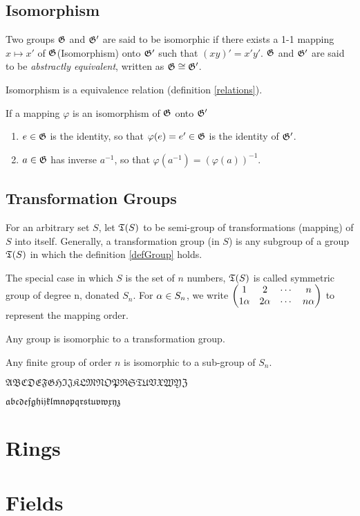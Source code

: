 	\subsection{Isomorphism}
		\begin{definition}
		Two groups $\mathfrak{G}$ and $\mathfrak{G}'$ are said to be isomorphic if there exists a 1-1 mapping $x\mapsto x'$ of $\mathfrak{G}$(Isomorphism) onto $\mathfrak{G}'$ such that $(xy)'=x'y'$. $\mathfrak{G}$ and $\mathfrak{G}'$ are said to be \textit{abstractly equivalent}, written as $\mathfrak{G}\cong\mathfrak{G}'$.
		\end{definition}
		\begin{theorem}
		Isomorphism is a equivalence relation (definition \ref{relations}). 
		\end{theorem}
		\begin{theorem}
		If a mapping $\varphi$ is an isomorphism of $\mathfrak{G}$ onto $\mathfrak{G}'$
 		\begin{enumerate}
		\item $e\in\mathfrak{G}$ is the identity, so that $\varphi(e)=e'\in\mathfrak{G}$ is the identity of $\mathfrak{G}'$.
		\item $a\in\mathfrak{G}$ has inverse $a^{-1}$, so that $\varphi(a^{-1})=(\varphi(a))^{-1}$.
		\end{enumerate}
		\end{theorem}
	\subsection{Transformation Groups}
	\begin{definition}
	For an arbitrary set $S$, let $\mathfrak{T}(S)$ to be semi-group of transformations (mapping) of $S$ into itself. Generally, a transformation group (in $S$) is any subgroup of a group $\mathfrak{T}(S)$ in which the definition \ref{defGroup} holds.
	\end{definition}
	\begin{definition}
	The special case in which $S$ is the set of $n$ numbers, $\mathfrak{T}(S)$ is called symmetric group of degree n, donated $S_n$. For $\alpha\in S_n$, we write 
	$\begin{pmatrix}
	1 & 2 & \cdots & n\\
	1\alpha & 2\alpha & \cdots & n\alpha\\
	\end{pmatrix}$
	to represent the mapping order.
	\end{definition}
	\begin{theorem}
	Any group is isomorphic to a transformation group.
	\end{theorem}
	\begin{corollary}
	Any finite group of order $n$ is isomorphic to a sub-group of $S_n$.
	\end{corollary}
	
	$\mathfrak{ABCDEFGHIJKLMNOPRSTUVXWYZ}$
	
	$\mathfrak{abcdefghijklmnopqrstuvwxyz}$
	\section{Rings}
	\section{Fields}
	
